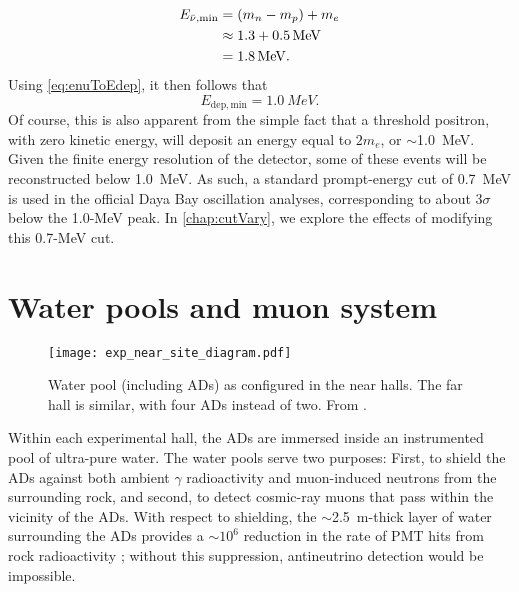 \documentclass[../thesis.tex]{subfiles}
\begin{document}
\begin{align*}
  E_{\bar\nu,\mathrm{min}} &= (m_n - m_p) + m_e \\
                    &\approx 1.3 + \SI{0.5}{MeV} \\
                    &= \SI{1.8}{MeV}.
\end{align*}
Using \autoref{eq:enuToEdep}, it then follows that
\begin{equation}
  E_{\mathrm{dep},\mathrm{min}} = \SI{1.0}{MeV}.
\end{equation}
Of course, this is also apparent from the simple fact that a threshold positron, with zero kinetic energy, will deposit an energy equal to $2m_e$, or $\sim$1.0~MeV. Given the finite energy resolution of the detector, some of these events will be reconstructed below 1.0~MeV. As such, a standard prompt-energy cut of 0.7~MeV is used in the official Daya Bay oscillation analyses, corresponding to about 3$\sigma$ below the 1.0-MeV peak. In \autoref{chap:cutVary}, we explore the effects of modifying this 0.7-MeV cut.

\section{Water pools and muon system}
\label{sec:expShieldVeto}

\begin{figure}[ht]
  \texttt{[image: exp\_near\_site\_diagram.pdf]}
  \caption{Water pool (including ADs) as configured in the near halls. The far hall is similar, with four ADs instead of two. From \cite{An_2017}.}
  \label{fig:expPool}
\end{figure}

Within each experimental hall, the ADs are immersed inside an instrumented pool of ultra-pure water. The water pools serve two purposes: First, to shield the ADs against both ambient $\gamma$ radioactivity and muon-induced neutrons from the surrounding rock, and second, to detect cosmic-ray muons that pass within the vicinity of the ADs. With respect to shielding, the $\sim$2.5~m-thick layer of water surrounding the ADs provides a $\sim10^6$ reduction in the rate of PMT hits from rock radioactivity \cite{Hack_2014}; without this suppression, antineutrino detection would be impossible.
\end{document}
